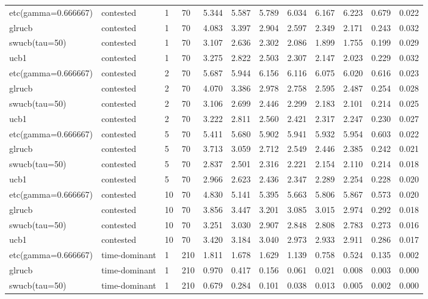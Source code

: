 \begin{tabular}{llllllllllll}
etc(gamma=0.666667) & contested & 1 & 70 & 5.344 & 5.587 & 5.789 & 6.034 & 6.167 & 6.223 & 0.679 & 0.022 \\
glrucb & contested & 1 & 70 & 4.083 & 3.397 & 2.904 & 2.597 & 2.349 & 2.171 & 0.243 & 0.032 \\
swucb(tau=50) & contested & 1 & 70 & 3.107 & 2.636 & 2.302 & 2.086 & 1.899 & 1.755 & 0.199 & 0.029 \\
ucb1 & contested & 1 & 70 & 3.275 & 2.822 & 2.503 & 2.307 & 2.147 & 2.023 & 0.229 & 0.032 \\
etc(gamma=0.666667) & contested & 2 & 70 & 5.687 & 5.944 & 6.156 & 6.116 & 6.075 & 6.020 & 0.616 & 0.023 \\
glrucb & contested & 2 & 70 & 4.070 & 3.386 & 2.978 & 2.758 & 2.595 & 2.487 & 0.254 & 0.028 \\
swucb(tau=50) & contested & 2 & 70 & 3.106 & 2.699 & 2.446 & 2.299 & 2.183 & 2.101 & 0.214 & 0.025 \\
ucb1 & contested & 2 & 70 & 3.222 & 2.811 & 2.560 & 2.421 & 2.317 & 2.247 & 0.230 & 0.027 \\
etc(gamma=0.666667) & contested & 5 & 70 & 5.411 & 5.680 & 5.902 & 5.941 & 5.932 & 5.954 & 0.603 & 0.022 \\
glrucb & contested & 5 & 70 & 3.713 & 3.059 & 2.712 & 2.549 & 2.446 & 2.385 & 0.242 & 0.021 \\
swucb(tau=50) & contested & 5 & 70 & 2.837 & 2.501 & 2.316 & 2.221 & 2.154 & 2.110 & 0.214 & 0.018 \\
ucb1 & contested & 5 & 70 & 2.966 & 2.623 & 2.436 & 2.347 & 2.289 & 2.254 & 0.228 & 0.020 \\
etc(gamma=0.666667) & contested & 10 & 70 & 4.830 & 5.141 & 5.395 & 5.663 & 5.806 & 5.867 & 0.573 & 0.020 \\
glrucb & contested & 10 & 70 & 3.856 & 3.447 & 3.201 & 3.085 & 3.015 & 2.974 & 0.292 & 0.018 \\
swucb(tau=50) & contested & 10 & 70 & 3.251 & 3.030 & 2.907 & 2.848 & 2.808 & 2.783 & 0.273 & 0.016 \\
ucb1 & contested & 10 & 70 & 3.420 & 3.184 & 3.040 & 2.973 & 2.933 & 2.911 & 0.286 & 0.017 \\
etc(gamma=0.666667) & time-dominant & 1 & 210 & 1.811 & 1.678 & 1.629 & 1.139 & 0.758 & 0.524 & 0.135 & 0.002 \\
glrucb & time-dominant & 1 & 210 & 0.970 & 0.417 & 0.156 & 0.061 & 0.021 & 0.008 & 0.003 & 0.000 \\
swucb(tau=50) & time-dominant & 1 & 210 & 0.679 & 0.284 & 0.101 & 0.038 & 0.013 & 0.005 & 0.002 & 0.000 \\

\end{tabular}

